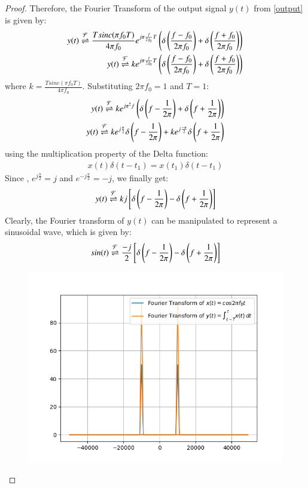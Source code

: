 \documentclass[journal,12pt,twocolumn]{IEEEtran}
\begin{document}
\begin{proof}
Therefore, the Fourier Transform of the output signal $y(t)$ from \eqref{output} is given by:
 \begin{align}
     y(t) \overset{\mathcal{F}}{ \rightleftharpoons} \frac{Tsinc(\pi f_0 T)}{4\pi f_0}e^{j\pi \frac{f}{2f_0}T}\left(\delta\left(\frac{f - f_0}{2\pi f_0}\right) + \delta\left(\frac{f + f_0}{2\pi f_0}\right)\right)\\
     y(t) \overset{\mathcal{F}}{ \rightleftharpoons} ke^{j\pi \frac{f}{2f_0}T}\left(\delta\left(\frac{f - f_0}{2\pi f_0}\right) + \delta\left(\frac{f + f_0}{2\pi f_0}\right)\right)
 \end{align}
 where $k = \frac{Tsinc(\pi f_0T)}{4\pi f_0}$. Substituting $2\pi f_0 = 1$ and $T = 1$:
 \begin{align}
     y(t) \overset{\mathcal{F}}{ \rightleftharpoons} ke^{j\pi^2f}\left(\delta\left(f - \frac{1}{2\pi}\right) + \delta\left(f + \frac{1}{2\pi}\right)\right)\\
     y(t) \overset{\mathcal{F}}{ \rightleftharpoons} ke^{j\frac{\pi}{2}}\delta\left(f - \frac{1}{2\pi}\right) +ke^{j\frac{-\pi}{2}}\delta\left(f + \frac{1}{2\pi}\right)
 \end{align}
 using the multiplication property of the Delta function:
 \begin{align}
     x(t)\delta(t - t_1) = x(t_1)\delta(t - t_1)
 \end{align}
 Since , $e^{j\frac{\pi}{2}} = j$ and $e^{-j\frac{\pi}{2}} = -j$, we finally get:
 \begin{align}
 y(t) \overset{\mathcal{F}}{ \rightleftharpoons} kj{}\left[\delta\left(f - \frac{1}{2\pi}\right) - \delta\left(f + \frac{1}{2\pi}\right)\right]
 \end{align}
 Clearly, the Fourier transform of $y(t)$ can be manipulated to represent a  sinusoidal wave, which is given by:
 \begin{align}
     sin(t) \overset{\mathcal{F}}{ \rightleftharpoons} \frac{-j}{2}{}\left[\delta\left(f-\frac{1}{2\pi}\right) - \delta\left(f + \frac{1}{2\pi}\right)\right]
 \end{align}
\begin{figure}[!ht]
\centering
 \includegraphics[width=\columnwidth]{graphs/fourier.png}

\end{figure}
\end{proof}
\end{document}
